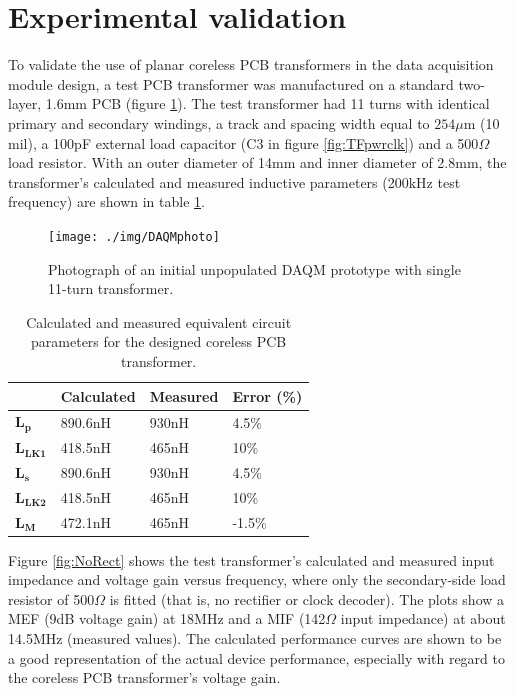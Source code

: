 \documentclass[conference]{IEEEtran}
\begin{document}
\section{Experimental validation}
To validate the use of planar coreless PCB transformers in the data acquisition module design, a test PCB transformer was manufactured on a standard two-layer, 1.6mm PCB (figure \ref{fig:DAQMphoto}).  The test transformer had 11 turns with identical primary and secondary windings, a track and spacing width equal to $ 254\mu $m (10 mil), a 100pF external load capacitor (C3 in figure \ref{fig:TFpwrclk}) and a 500$\Omega$ load resistor.  With an outer diameter of 14mm and inner diameter of 2.8mm, the transformer's calculated and measured inductive parameters (200kHz test frequency) are shown in table \ref{tab:transformerParameters}.

\begin{figure}[t]
	\centering
	\texttt{[image: ./img/DAQMphoto]}
	\caption{Photograph of an initial unpopulated DAQM prototype with single 11-turn transformer.}
	\label{fig:DAQMphoto}
\end{figure}

\begin{table}[t]
	\centering
	\caption{Calculated and measured equivalent circuit parameters for the designed coreless PCB transformer.}
	\label{tab:transformerParameters}
	\begin{tabular}{l|l|l|l|}
	\cline{2-4}
	              & \textbf{Calculated} & \textbf{Measured} & \textbf{Error (\%)} \\[3pt] \hline 
	\multicolumn{1}{|l|}{$\mathbf{L_{p}}$}   & 890.6nH    & 930nH    & 4.5\%      \\[3pt] \hline 
	\multicolumn{1}{|l|}{$\mathbf{L_{LK1}}$} & 418.5nH    & 465nH    & 10\%       \\[3pt] \hline 
	\multicolumn{1}{|l|}{$\mathbf{L_{s}}$}   & 890.6nH    & 930nH    & 4.5\%      \\[3pt] \hline 
	\multicolumn{1}{|l|}{$\mathbf{L_{LK2}}$} & 418.5nH    & 465nH    & 10\%       \\[3pt] \hline 
	\multicolumn{1}{|l|}{$\mathbf{L_{M}}$}   & 472.1nH    & 465nH    & -1.5\%     \\[3pt] \hline
	\end{tabular}
\end{table}

Figure \ref{fig:NoRect} shows the test transformer's calculated and measured input impedance and voltage gain versus frequency, where only the secondary-side load resistor of 500$\Omega$ is fitted (that is, no rectifier or clock decoder).  The plots show a MEF (9dB voltage gain) at 18MHz and a MIF (142$\Omega$ input impedance) at about 14.5MHz (measured values).  The calculated performance curves are shown to be a good representation of the actual device performance, especially with regard to the coreless PCB transformer's voltage gain.
\end{document}
